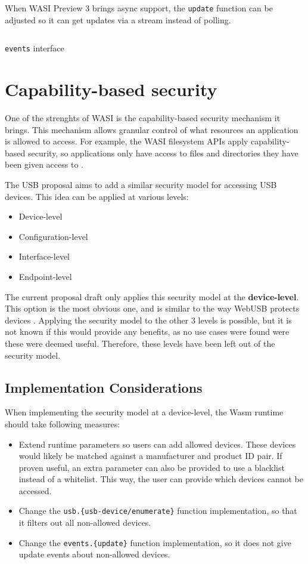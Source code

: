 When \acrshort{WASI} Preview 3 brings async support, the \texttt{update} function can be adjusted so it can get updates via a stream instead of polling.

\begin{code}
\inputminted[breaklines]{text}{WIT/wit/events.wit}
\caption{\texttt{events} interface}
\label{code:events_interface}
\end{code}

\section{Capability-based security}
One of the strenghts of \acrshort{WASI} is the capability-based security mechanism it brings. This mechanism allows granular control of what resources an application is allowed to access. For example, the \acrshort{WASI} filesystem APIs apply capability-based security, so applications only have access to files and directories they have been given access to \cite{wasi_security}.

The \acrshort{USB} proposal aims to add a similar security model for accessing USB devices. This idea can be applied at various levels:
\begin{itemize}
\item Device-level
\item Configuration-level
\item Interface-level
\item Endpoint-level
\end{itemize}

The current proposal draft only applies this security model at the \textbf{device-level}. This option is the most obvious one, and is similar to the way WebUSB protects devices \cite{webusb_security}. Applying the security model to the other 3 levels is possible, but it is not known if this would provide any benefits, as no use cases were found were these were deemed useful. Therefore, these levels have been left out of the security model.

\subsection{Implementation Considerations}
When implementing the security model at a device-level, the \acrshort{Wasm} runtime should take following measures:
\begin{itemize}
\item Extend runtime parameters so users can add allowed devices. These devices would likely be matched against a manufacturer and product ID pair. If proven useful, an extra parameter can also be provided to use a blacklist instead of a whitelist. This way, the user can provide which devices cannot be accessed.
\item Change the \texttt{usb.\{usb-device/enumerate\}} function implementation, so that it filters out all non-allowed devices.
\item Change the \texttt{events.\{update\}} function implementation, so it does not give update events about non-allowed devices.
\end{itemize}


